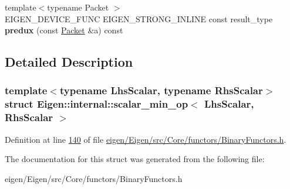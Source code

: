 \begin{DoxyCompactItemize}
\item 
\mbox{\label{struct_eigen_1_1internal_1_1scalar__min__op_ad0ea70c2932e09c23e469946bd285cde}} 
{\footnotesize template$<$typename Packet $>$ }\\E\+I\+G\+E\+N\+\_\+\+D\+E\+V\+I\+C\+E\+\_\+\+F\+U\+NC E\+I\+G\+E\+N\+\_\+\+S\+T\+R\+O\+N\+G\+\_\+\+I\+N\+L\+I\+NE const result\+\_\+type {\bfseries predux} (const \hyperlink{union_eigen_1_1internal_1_1_packet}{Packet} \&a) const
\end{DoxyCompactItemize}


\subsection{Detailed Description}
\subsubsection*{template$<$typename Lhs\+Scalar, typename Rhs\+Scalar$>$\newline
struct Eigen\+::internal\+::scalar\+\_\+min\+\_\+op$<$ Lhs\+Scalar, Rhs\+Scalar $>$}



Definition at line \hyperlink{eigen_2_eigen_2src_2_core_2functors_2_binary_functors_8h_source_l00140}{140} of file \hyperlink{eigen_2_eigen_2src_2_core_2functors_2_binary_functors_8h_source}{eigen/\+Eigen/src/\+Core/functors/\+Binary\+Functors.\+h}.



The documentation for this struct was generated from the following file\+:\begin{DoxyCompactItemize}
\item 
eigen/\+Eigen/src/\+Core/functors/\+Binary\+Functors.\+h\end{DoxyCompactItemize}

